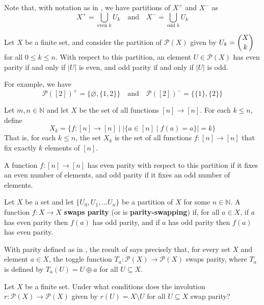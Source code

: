 Note that, with notation as in , we have partitions of $X^+$ and $X^-$ as
\[ X^+ = \bigcup_{\text{even } k} U_k \quad \text{and} \quad X^- = \bigcup_{\text{odd } k} U_k \]

\begin{example}
\label{exPartitionOfPowerSetOfFiniteSet}
Let $X$ be a finite set, and consider the partition of $\mathcal{P}(X)$ given by $U_k = \dbinom{X}{k}$ for all $0 \le k \le n$. With respect to this partition, an element $U \in \mathcal{P}(X)$ has even parity if and only if $|U|$ is even, and odd parity if and only if $|U|$ is odd.

For example, we have
\[ \mathcal{P}([2])^+ = \{ \varnothing, \{ 1, 2 \} \} \quad \text{and} \quad \mathcal{P}([2])^{-} = \{ \{ 1 \}, \{ 2 \} \} \]
\end{example}

\begin{example}
\label{exPartitionOfFunctionsFromNToN}
Let $m,n \in \mathbb{N}$ and let $X$ be the set of all functions $[n] \to [n]$. For each $k \le n$, define
\[ X_k = \{ f : [n] \to [n] \mid |\{ a \in [n] \mid f(a) = a \}| = k \} \]
That is, for each $k \le n$, the set $X_k$ is the set of all functions $f : [n] \to [n]$ that fix exactly $k$ elements of $[n]$.

A function $f : [n] \to [n]$ has even parity with respect to this partition if it fixes an even number of elements, and odd parity if it fixes an odd number of elements.
\end{example}

\begin{definition}
\label{defParitySwappingFunction}
Let $X$ be a set and let $\{ U_0, U_1, \dots U_n \}$ be a partition of $X$ for some $n \in \mathbb{N}$. A function $f : X \to X$ \textbf{swaps parity} (or is \textbf{parity-swapping}) if, for all $a \in X$, if $a$ has even parity then $f(a)$ has odd parity, and if $a$ has odd parity then $f(a)$ has even parity.
\end{definition}

\begin{example}
With parity defined as in , the result of  says precisely that, for every set $X$ and element $a \in X$, the toggle function $T_a : \mathcal{P}(X) \to \mathcal{P}(X)$ swaps parity, where $T_a$ is defined by $T_a(U) = U \oplus a$ for all $U \subseteq X$.
\end{example}

\begin{exercise}
Let $X$ be a finite set. Under what conditions does the involution $r : \mathcal{P}(X) \to \mathcal{P}(X)$ given by $r(U) = X \setminus U$ for all $U \subseteq X$ swap parity?
\end{exercise}

